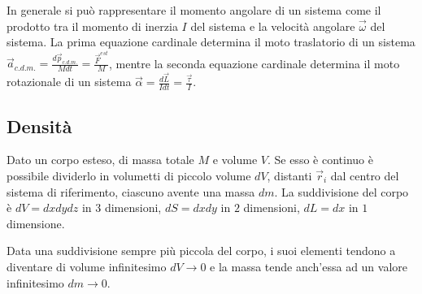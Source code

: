 \documentclass{article}
\numberwithin{equation}{subsection}
\begin{document}
\begin{center}\end{center}

In generale si può rappresentare il momento angolare di un sistema 
come il prodotto tra il momento di inerzia $I$ del sistema e la velocità angolare $\vec\omega$ del sistema. 
La prima equazione cardinale determina il moto traslatorio di un sistema $\vec{a}_{c.d.m.}=\displaystyle\frac{d\vec{p}_{c.d.m.}}{Mdt}=\frac{\vec{F}^{est}}{M}$, 
mentre la seconda equazione cardinale determina il moto rotazionale di un sistema $\vec{\alpha}=\displaystyle\frac{d\vec{L}}{Idt}=\frac{\vec{\tau}}{I}$. 

\subsection{Densità}

Dato un corpo esteso, di massa totale $M$ e volume $V$. Se esso è continuo è possibile dividerlo 
in volumetti di piccolo volume $dV$, distanti $\vec{r}_i$ dal centro del sistema di 
riferimento, ciascuno avente una massa $dm$. La suddivisione del corpo è 
$dV=dxdydz$ in $3$ dimensioni, $dS=dxdy$ in $2$ dimensioni, 
$dL=dx$ in $1$ dimensione. 

Data una suddivisione sempre più piccola del corpo, i suoi elementi tendono a diventare di volume infinitesimo $dV\to 0$ e 
la massa tende anch'essa ad un valore infinitesimo $dm\to 0$.
\end{document}

